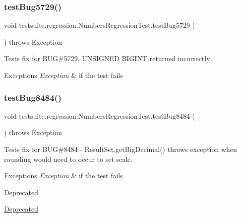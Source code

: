 \subsubsection{\texorpdfstring{test\+Bug5729()}{testBug5729()}}
{\footnotesize\ttfamily void testsuite.\+regression.\+Numbers\+Regression\+Test.\+test\+Bug5729 (\begin{DoxyParamCaption}{ }\end{DoxyParamCaption}) throws Exception}

Tests fix for B\+UG\#5729, U\+N\+S\+I\+G\+N\+ED B\+I\+G\+I\+NT returned incorrectly


\begin{DoxyExceptions}{Exceptions}
{\em Exception} & if the test fails \\
\hline
\end{DoxyExceptions}
\mbox{\label{classtestsuite_1_1regression_1_1_numbers_regression_test_a28ea888d744588001519dd5cafde7074}} 
\subsubsection{\texorpdfstring{test\+Bug8484()}{testBug8484()}}
{\footnotesize\ttfamily void testsuite.\+regression.\+Numbers\+Regression\+Test.\+test\+Bug8484 (\begin{DoxyParamCaption}{ }\end{DoxyParamCaption}) throws Exception}

Tests fix for B\+UG\#8484 -\/ Result\+Set.\+get\+Big\+Decimal() throws exception when rounding would need to occur to set scale.


\begin{DoxyExceptions}{Exceptions}
{\em Exception} & if the test fails \\
\hline
\end{DoxyExceptions}
\begin{DoxyRefDesc}{Deprecated}
\item[\mbox{\hyperlink{deprecated__deprecated000005}{Deprecated}}]\end{DoxyRefDesc}
\mbox{\label{classtestsuite_1_1regression_1_1_numbers_regression_test_a1cee824b008e722d36c7d179fb3774d0}} 

